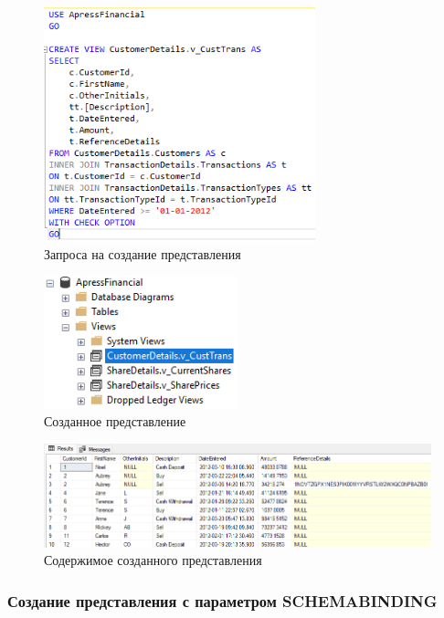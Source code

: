 \documentclass[a4paper, 14pt]{extarticle}
\begin{document}
\begin{figure}[H]
  \centering
  \includegraphics[width=0.7\textwidth]{images/task-3/1.png}
  \caption{Запроса на создание представления}
  \label{fig:task-3-1}
\end{figure}

\begin{figure}[H]
  \centering
  \includegraphics[width=0.5\textwidth]{images/task-3/2.png}
  \caption{Созданное представление}
  \label{fig:task-3-2}
\end{figure}

\begin{figure}[H]
  \centering
  \includegraphics[width=\textwidth]{images/task-3/3.png}
  \caption{Содержимое созданного представления}
  \label{fig:task-3-3}
\end{figure}

\subsubsection{Создание представления с параметром SCHEMABINDING}
\end{document}
